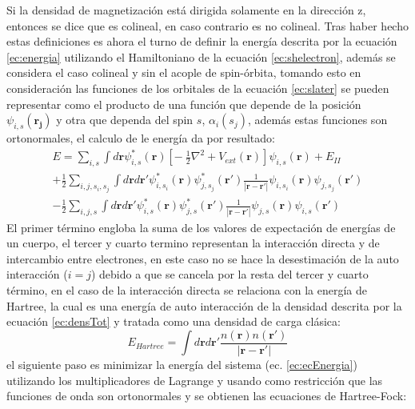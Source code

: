 \documentclass[12pt,a4paper, oneside]{book}
\begin{document}
  Si la densidad de magnetizaci\'on est\'a dirigida solamente en la direcci\'on z, entonces se dice que es colineal, en caso contrario es no colineal. 
  \newline \newline
  Tras haber hecho estas definiciones es ahora el turno de definir la energ\'ia descrita por la ecuaci\'on \ref{ec:energia} utilizando el Hamiltoniano de la ecuaci\'on \ref{ec:shelectron}, adem\'as se considera el caso colineal y sin el acople de spin-\'orbita, tomando esto en consideraci\'on las funciones de los orbitales de la ecuaci\'on \ref{ec:slater} se pueden representar como el producto de una funci\'on que depende de la posici\'on $ \psi_{i,s} (\pmb{r_j}) $ y otra que dependa del spin $s$, $ \alpha_i (s_j)$, adem\'as estas funciones son ortonormales, el calculo de le energ\'ia da por resultado:
  \begin{multline}
  E =\sum_{i,s} \int d\pmb{r} \psi_{i,s}^* (\pmb{r})\left [ -~\frac{1}{2} \nabla^2 + V_{ext} (\pmb{r}) \right] \psi_{i,s} (\pmb{r}) +E_{II}\\
  +\frac{1}{2} \sum_{i,j,s_i,s_j} \int d\pmb{r} d\pmb{r'} \psi_{i,s_i}^* (\pmb{r}) \psi_{j,s_j}^* (\pmb{r '}) \frac{1}{|\pmb{r}-\pmb{r'}|} \psi_{i,s_i} (\pmb{r}) \psi_{j,s_j} (\pmb{r '})\\
  -\frac{1}{2} \sum_{i,j,s} \int d\pmb{r} d\pmb{r'} \psi_{i,s}^* (\pmb{r}) \psi_{j,s}^* (\pmb{r '}) \frac{1}{|\pmb{r}-\pmb{r'}|} \psi_{j,s} (\pmb{r}) \psi_{i,s} (\pmb{r '}) \label{ec:ecEnergia}
  \end{multline} 
  El primer t\'ermino engloba la suma de los valores de expectaci\'on  de energ\'ias de un cuerpo, el tercer y cuarto termino representan la interacci\'on directa y de intercambio entre electrones, en este caso no se hace la desestimaci\'on de la auto interacci\'on ($ i=j$) debido a que se cancela por la resta del tercer y cuarto t\'ermino, en el caso de la interacci\'on directa se relaciona con la energ\'ia de Hartree, la cual es una energ\'ia de auto interacci\'on  de la densidad descrita por la ecuaci\'on \ref{ec:densTot} y tratada como una densidad de carga cl\'asica:
  \begin{equation}
  E_{Hartree} = \int d \pmb{r} d \pmb{r'} \frac{n(\pmb{r}) n(\pmb{r'})}{|\pmb{r}-\pmb{r'}|} \label{ec:Hartree}
  \end{equation}
  \newline
  el siguiente paso es minimizar la energ\'ia del sistema (ec. \ref{ec:ecEnergia}) utilizando los multiplicadores de Lagrange y usando como restricci\'on que las funciones de onda son ortonormales y se obtienen las ecuaciones de Hartree-Fock:
\end{document}
